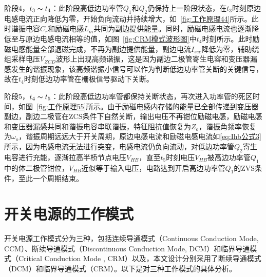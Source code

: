 
阶段4，$t_3 \thicksim t_4$：此阶段高低边功率管$Q_1$和$Q_2$仍保持上一阶段状态，在$t_3$时刻原边电感电流正向降低为零，开始负向流动并持续增大，如~\ref{fig:工作原理44}所示。此时谐振电容$C_r$和励磁电感$L_m$共同为副边提供能量。同时，励磁电感电流也逐渐降低至与原边电感电流相等的值，如图~\ref{fig:CRM模式波形图}中$t_4$时刻所示。此时励磁电感能量全部退磁完成，不再为副边提供能量，副边电流$I_{sec}$降低为零，辅助绕组采样电压$V_{ZCD}$波形上出现高频谐振，这是因为副边二极管寄生电容和变压器漏感发生的谐振现象，该高频谐振小信号可以作为判断低边功率管关断的关键信号，故在$t_4$时刻低边功率管在栅极信号驱动下关断。

                
阶段5，$t_4 \thicksim t_5$：此阶段高低边功率管都保持关断状态，再次进入功率管的死区时间，如图~\ref{fig:工作原理55}所示。由于励磁电感内存储的能量已全部传递到变压器副边，副边二极管在ZCS条件下自然关断，输出电压不再钳位励磁电感，励磁电感和变压器漏感共同和谐振电容串联谐振，特征阻抗值恢复为$Z_o$，谐振角频率恢复为$\omega_o$，谐振周期远远大于开关周期，原边电感电流和励磁电感电流如\eqref{eq:Ihb公式3}所示，因为电感电流无法进行突变，电感电流仍负向流动，对低边功率管$Q_2$寄生电容进行充能，逐渐拉高半桥节点电压$V_{HB}$，直至$t_5$时刻电压$V_{HB}$被高边功率管$Q_1$中的体二极管钳位，$V_{HB}$近似等于输入电压，电路达到开启高边功率管$Q_1$的ZVS条件，至此一个周期结束。

								



\section{开关电源的工作模式}
\label{sec:dataset-build}

开关电源工作模式分为三种，包括连续导通模式（Continuous Conduction Mode, CCM）、断续导通模式（Discontinuous Conduction Mode, DCM）和临界导通模式（Critical Conduction Mode , CRM）以及，本文设计分别采用了断续导通模式（DCM）和临界导通模式（CRM）。以下是对三种工作模式的具体分析\cite{xuan2017ccm,liang2017primary}。

